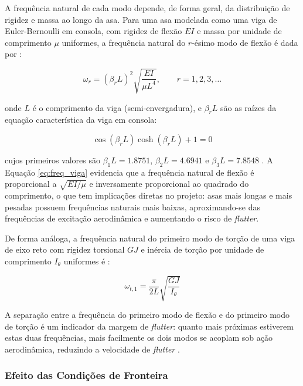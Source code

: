 \documentclass[a4paper,fleqn,noprintline]{cas-dc}
\begin{document}
A frequência natural de cada modo depende, de forma geral, da distribuição de rigidez e massa ao longo da asa. Para uma asa modelada como uma viga de Euler-Bernoulli em consola, com rigidez de flexão $EI$ e massa por unidade de comprimento $\mu$ uniformes, a frequência natural do $r$-ésimo modo de flexão é dada por \cite{Rao2011}:

\begin{equation}
    \omega_r = \left(\beta_r L\right)^2 \sqrt{\frac{EI}{\mu L^4}}, 
    \qquad r = 1, 2, 3, \ldots
    \label{eq:freq_viga}
\end{equation}

\noindent onde $L$ é o comprimento da viga (semi-envergadura), e $\beta_r L$ são as raízes da equação característica da viga em consola:

\begin{equation}
    \cos(\beta_r L)\cosh(\beta_r L) + 1 = 0
    \label{eq:char_cantilever}
\end{equation}

cujos primeiros valores são $\beta_1 L = 1.8751$, $\beta_2 L = 4.6941$ e $\beta_3 L = 7.8548$ \cite{Rao2011}. A Equação \eqref{eq:freq_viga} evidencia que a frequência natural de flexão é proporcional a $\sqrt{EI/\mu}$ e inversamente proporcional ao quadrado do comprimento, o que tem implicações diretas no projeto: asas mais longas e mais pesadas possuem frequências naturais mais baixas, aproximando-se das frequências de excitação aerodinâmica e aumentando o risco de \textit{flutter}.

De forma análoga, a frequência natural do primeiro modo de torção de uma viga de eixo reto com rigidez torsional $GJ$ e inércia de torção por unidade de comprimento $I_\theta$ uniformes é \cite{Bisplinghoff1996}:

\begin{equation}
    \omega_{t,1} = \frac{\pi}{2L}\sqrt{\frac{GJ}{I_\theta}}
    \label{eq:freq_torcao}
\end{equation}

A separação entre a frequência do primeiro modo de flexão e do primeiro modo de torção é um indicador da margem de \textit{flutter}: quanto mais próximas estiverem estas duas frequências, mais facilmente os dois modos se acoplam sob ação aerodinâmica, reduzindo a velocidade de \textit{flutter} \cite{Fung1993, Dowell2004}.

\subsubsection{Efeito das Condições de Fronteira}
\end{document}
